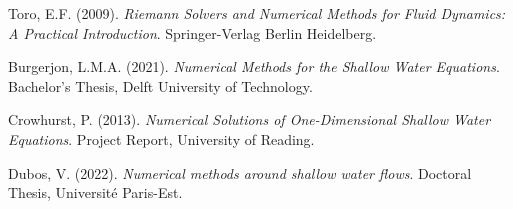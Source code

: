 \documentclass{article}
\begin{document}
\begin{thebibliography}{99}
Toro, E.F. (2009). \textit{Riemann Solvers and Numerical Methods for Fluid Dynamics: A Practical Introduction}. Springer-Verlag Berlin Heidelberg.

Burgerjon, L.M.A. (2021). \textit{Numerical Methods for the Shallow Water Equations}. Bachelor's Thesis, Delft University of Technology.

Crowhurst, P. (2013). \textit{Numerical Solutions of One-Dimensional Shallow Water Equations}. Project Report, University of Reading.

Dubos, V. (2022). \textit{Numerical methods around shallow water flows}. Doctoral Thesis, Université Paris-Est.

\end{thebibliography}
\end{document}
